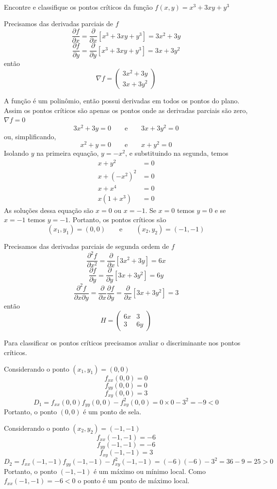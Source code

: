 \documentclass[a4paper,12pt,fleqn]{article}
\newcommand{\D}[2]{\frac{\partial {#1}}{\partial {#2}}}
\newcommand{\DS}[2]{\frac{\partial^2 {#1}}{\partial {#2}^2}}
\newcommand{\DM}[3]{\frac{\partial^2 {#1}}{\partial {#2} \partial {#3}}}
\newcommand{\vetor}[2]{\left(\begin{array}{c} #1 \\ #2 \end{array}\right)}
\begin{document}
Encontre e classifique os pontos críticos da função
\(
  f(x, y) = x^3 + 3xy + y^3
\)

\begin{answer}

  Precisamos das derivadas parciais de $f$
  \[
    \D{f}{x}
    = \D{}{x}\left[x^3 + 3xy + y^3\right]
    = 3x^2 + 3y
  \]
  \[
    \D{f}{y}
    = \D{}{y}\left[x^3 + 3xy + y^3\right]
    = 3x + 3y^2
  \]
  então
  \[
    \nabla f = \vetor{3x^2 + 3y}{3x + 3y^2}
  \]

  A função é um polinômio, então possui derivadas em todos os pontos do plano.
  Assim os pontos críticos são apenas os pontos onde as derivadas parciais são zero,
  \(\nabla f = 0\)
  \[
    3x^2 + 3y = 0
    \qquad\text{e}\qquad
    3x + 3y^2 = 0
  \]
  ou, simplificando,
  \[
    x^2 + y = 0
    \qquad\text{e}\qquad
    x + y^2 = 0
  \]
  Isolando $y$ na primeira equação, \(y = -x^2\), e substituindo na segunda, temos
  \begin{align*}
    x + y^2                 & = 0 \\
    x + \left(-x^2\right)^2 & = 0 \\
    x + x^4                 & = 0 \\
    x(1+ x^3)               & = 0
  \end{align*}
  As soluções dessa equação são $x=0$ ou $x=-1$.
  Se $x=0$ temos $y=0$ e
  se $x=-1$ temos $y=-1$.
  Portanto, os pontos críticos são
  \[
    (x_1, y_1) = (0, 0)
    \qquad\text{e}\qquad
    (x_2, y_2) = (-1, -1)
  \]

  Precisamos das derivadas parciais de segunda ordem de $f$
  \[
    \DS{f}{x}
    = \D{}{x}\left[3x^2 + 3y\right]
    = 6x
  \]
  \[
    \D{f}{y}
    = \D{}{y}\left[3x + 3y^2\right]
    = 6y
  \]
  \[
    \DM{f}{x}{y}
    = \D{}{x}\D{f}{y}
    = \D{}{x}\left[3x + 3y^2\right]
    = 3
  \]
  então
  \[
    H = \left(\begin{array}{cc}
      6x & 3 \\
      3  & 6y
    \end{array}\right)
  \]

  Para classificar os pontos críticos precisamos avaliar o discriminante nos
  pontos críticos.

  Considerando o ponto \((x_1, y_1) = (0, 0)\)
  \[
    f_{xx}(0, 0) = 0
  \]
  \[
    f_{yy}(0, 0) = 0
  \]
  \[
    f_{xy}(0, 0) = 3
  \]
  \[
    D_1
    = f_{xx}(0, 0)f_{yy}(0, 0) - f^2_{xy}(0, 0)
    = 0 \times 0 - 3^2
    = -9 < 0
  \]
  Portanto, o ponto $(0, 0)$ é um ponto de sela.

  Considerando o ponto \((x_2, y_2) = (-1, -1)\)
  \[
    f_{xx}(-1, -1) = -6
  \]
  \[
    f_{yy}(-1, -1) = -6
  \]
  \[
    f_{xy}(-1, -1) = 3
  \]
  \[
    D_2
    = f_{xx}(-1, -1)f_{yy}(-1, -1) - f^2_{xy}(-1, -1)
    = (-6)(-6) - 3^2
    = 36 - 9
    = 25 > 0
  \]
  Portanto, o ponto $(-1, -1)$ é um máximo ou mínimo local.
  Como \(f_{xx}(-1, -1) = -6 < 0\)
  o ponto é um ponto de máximo local.
  \clearpage
\end{answer}
\end{document}
